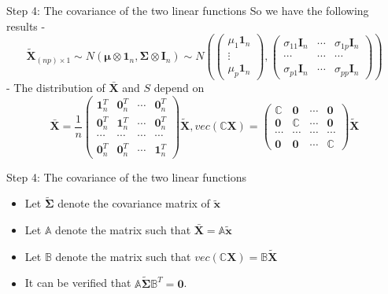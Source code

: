 \documentclass[
  ignorenonframetext,
]{beamer}
\providecommand{\tightlist}{%
  \setlength{\itemsep}{0pt}\setlength{\parskip}{0pt}}
\begin{document}
\begin{frame}{Step 4: The covariance of the two linear functions}
\protect\hypertarget{step-4-the-covariance-of-the-two-linear-functions}{}
So we have the following results - \[
\tilde {\mathbf X}_{(np)\times 1} 
\sim N(\boldsymbol \mu \otimes\mathbf 1_n, 
\boldsymbol \Sigma \otimes \mathbf I_n)
\sim 
N (
\begin{pmatrix}\mu_1 \mathbf 1_n \\ \vdots \\\mu_p \mathbf 1_n\end{pmatrix},  
\begin{pmatrix}
\sigma_{11}\mathbf I_n & \cdots & \sigma_{1p}\mathbf I_n\\
\cdots & \cdots & \cdots \\
\sigma_{p1}\mathbf I_n & \cdots & \sigma_{pp}\mathbf I_n
\end{pmatrix})
\] - The distribution of \(\bar{\mathbf X}\) and \(S\) depend on
\[\bar{\mathbf X}=\frac{1}{n} \begin{pmatrix} 
\mathbf 1_n^T & \mathbf 0_n^T & \cdots &\mathbf 0_n^T \\
\mathbf 0_n^T & \mathbf 1_n^T & \cdots &\mathbf 0_n^T \\
\cdots & \cdots & \cdots & \cdots \\
\mathbf 0_n^T & \mathbf 0_n^T & \cdots &\mathbf 1_n^T 
\end{pmatrix} \tilde {\mathbf X},  vec(\mathbb C \mathbf X) = 
\begin{pmatrix}
\mathbb C & \mathbf 0 & \cdots & \mathbf 0\\
\mathbf 0 & \mathbb C & \cdots & \mathbf 0\\
\cdots & \cdots & \cdots & \cdots\\
\mathbf 0 & \mathbf 0 & \cdots & \mathbb C
\end{pmatrix} \tilde {\mathbf X}
\]
\end{frame}

\begin{frame}{Step 4: The covariance of the two linear functions}
\protect\hypertarget{step-4-the-covariance-of-the-two-linear-functions-1}{}
\begin{itemize}
\tightlist
\item
  Let \(\tilde {\boldsymbol \Sigma}\) denote the covariance matrix of
  \(\tilde {\mathbf x}\)
\item
  Let \(\mathbb A\) denote the matrix such that
  \(\bar{\mathbf X}=\mathbb A \tilde {\mathbf x}\)
\item
  Let \(\mathbb B\) denote the matrix such that
  \(vec(\mathbb C\mathbf X)=\mathbb B \tilde {\mathbf X}\)
\item
  It can be verified that
  \(\mathbb A \tilde {\boldsymbol \Sigma} \mathbb B^T=\mathbf 0\).
\end{itemize}
\end{frame}
\end{document}
